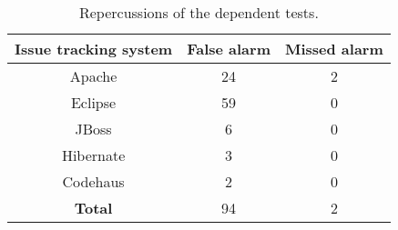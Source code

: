 \begin{table}
\begin{center}
\setlength{\tabcolsep}{0.5\tabcolsep}
\begin{tabular}{|c||c|c|}
\hline
\textbf{Issue tracking system} & \textbf{False alarm} & \textbf{Missed alarm} \\
\hline
Apache &24 & 2 \\
\hline
Eclipse & 59 & 0 \\
\hline
JBoss& 6 & 0 \\
\hline
Hibernate & 3 & 0 \\
\hline
Codehaus & 2 & 0 \\
\hline
\hline
\textbf{Total}  & 94 & 2 \\
\hline
\end{tabular}
\end{center}
\caption{
Repercussions of the \dtnum dependent tests.
}
\label{tab:reper}
\smallsqueeze
\smallsqueeze
\end{table}


